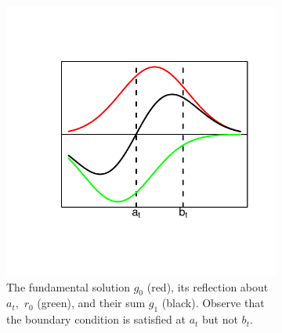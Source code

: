 

\begin{figure}[htbp]
        \centering
        \begin{subfigure}[t]{0.3\textwidth}
                \includegraphics[width=\textwidth]{g1.pdf}
                \caption{The fundamental solution $g_0$ (red), its reflection about $a_t,$ $r_0$ (green), and their sum $g_1$ (black). Observe that the boundary condition is satisfied at $a_t$ but not $b_t$.}
                \label{fig:g1}
        \end{subfigure}%
        ~ %
        \begin{subfigure}[t]{0.3\textwidth}

\end{subfigure}
\end{figure}
